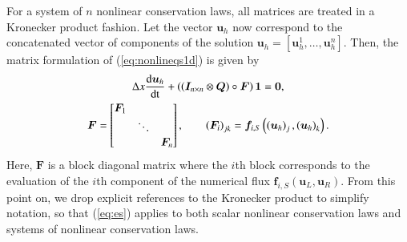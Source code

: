 \documentclass[preprint,10pt]{elsarticle}
\theoremstyle{definition}
\theoremstyle{lemma}
\theoremstyle{theorem}
\theoremstyle{assumption}
\newcommand{\td}[2]{\frac{{\rm d}#1}{{\rm d}{\rm #2}}}
\newcommand{\LRp}[1]{\left( #1 \right)}
\begin{document}
For a system of $n$ nonlinear conservation laws, all matrices are treated in a Kronecker product fashion.  Let the vector $\bm{u}_h$ now correspond to the concatenated vector of components of the solution $\bm{u}_h = [\bm{u}_h^1, \ldots, \bm{u}_h^n]$.  Then, the matrix formulation of (\ref{eq:nonlineqs1d}) is given by
\begin{gather*}
\Delta x\td{\bm{u}_h}{t} + \LRp{\LRp{\bm{I}_{n \times n} \otimes \bm{Q} }\circ \bm{F}}\bm{1} = \bm{0},\\
\bm{F} = \begin{bmatrix}
\bm{F}_{1} & &\\
& \ddots &\\
&& \bm{F}_{n} \\
\end{bmatrix}, \qquad 
\LRp{\bm{F}_{i}}_{jk} = \bm{f}_{i,S}\LRp{\LRp{\bm{u}_h}_j, \LRp{\bm{u}_h}_k}.
\label{eq:essys}
\end{gather*}
Here, $\bm{F}$ is a block diagonal matrix where the $i$th block corresponds to the evaluation of the $i$th component of the numerical flux $\bm{f}_{i,S}(\bm{u}_L,\bm{u}_R)$.  From this point on, we drop explicit references to the Kronecker product to simplify notation, so that (\ref{eq:es}) applies to both scalar nonlinear conservation laws and systems of nonlinear conservation laws.  
\end{document}
